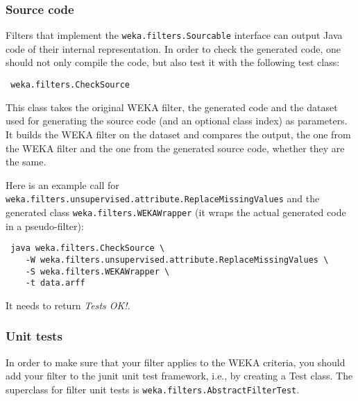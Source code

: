 \subsubsection{Source code}
Filters that implement the \texttt{weka.filters.Sourcable} interface can output
Java code of their internal representation. In order to check the generated
code, one should not only compile the code, but also test it with the following
test class:
\begin{verbatim}
 weka.filters.CheckSource
\end{verbatim}
This class takes the original WEKA filter, the generated code and the dataset
used for generating the source code (and an optional class index) as parameters.
It builds the WEKA filter on the dataset and compares the output, the one from
the WEKA filter and the one from the generated source code, whether they are the
same.

Here is an example call for
\texttt{weka.filters.unsupervised.attribute.ReplaceMissingValues} and the
generated class \texttt{weka.filters.WEKAWrapper} (it wraps the actual generated
code in a pseudo-filter):
\begin{verbatim}
 java weka.filters.CheckSource \
    -W weka.filters.unsupervised.attribute.ReplaceMissingValues \
    -S weka.filters.WEKAWrapper \
    -t data.arff
\end{verbatim}
It needs to return \textit{Tests OK!}.

\subsubsection{Unit tests}
In order to make sure that your filter applies to the WEKA criteria, you
should add your filter to the junit unit test framework, i.e., by creating a
Test class. The superclass for filter unit tests is
\texttt{weka.filters.AbstractFilterTest}.


